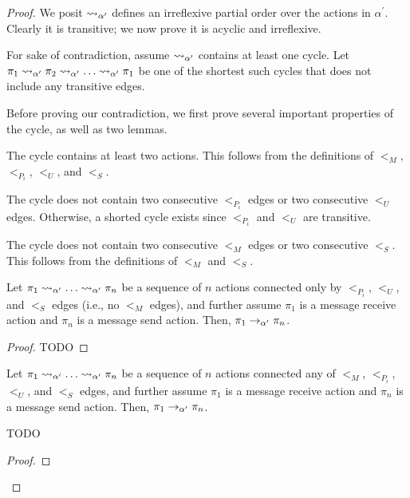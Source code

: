 \begin{proof}
  We posit $\rightsquigarrow_{\alpha^\prime}$ defines an irreflexive partial order over the actions
  in $\alpha^\prime$. Clearly it is transitive; we now prove it is acyclic and irreflexive.

  For sake of contradiction, assume $\rightsquigarrow_{\alpha^\prime}$ contains at least one cycle. Let
  $\pi_1 \rightsquigarrow_{\alpha^\prime} \pi_2 \rightsquigarrow_{\alpha^\prime} \ldots \rightsquigarrow_{\alpha^\prime} \pi_1$
  be one of the shortest such cycles that does not include any transitive edges.

  Before proving our contradiction, we first prove several important properties of the cycle,
  as well as two lemmas.

   The cycle contains at least two actions.
  This follows from the definitions of $<_M$, $<_{P_i}$, $<_U$, and $<_S$.

   The cycle does not contain two consecutive
  $<_{P_i}$ edges or two consecutive $<_U$ edges. Otherwise, a shorted cycle
  exists since $<_{P_i}$ and $<_U$ are transitive.

   The cycle does not contain two consecutive
  $<_M$ edges or two consecutive $<_S$. This follows from the definitions of
  $<_M$ and $<_S$.

  \begin{sublemma}
    Let $\pi_1 \rightsquigarrow_{\alpha^\prime} \ldots \rightsquigarrow_{\alpha^\prime} \pi_n$
    be a sequence of $n$ actions connected only by
    $<_{P_i}$, $<_U$, and $<_S$ edges (i.e., no $<_M$ edges), and further
    assume $\pi_1$ is a message receive action and $\pi_n$ is a message
    send action. Then, $\pi_1 \rightarrow_{\alpha^\prime} \pi_n$.
    \label{lemma:helper1}
  \end{sublemma}

  \begin{proof}
    TODO
  \end{proof}

  \begin{lemma}
    Let $\pi_1 \rightsquigarrow_{\alpha^\prime} \ldots \rightsquigarrow_{\alpha^\prime} \pi_n$
    be a sequence of $n$ actions connected any of $<_M$, $<_{P_i}$, $<_U$,
    and $<_S$ edges, and further assume $\pi_1$ is a message receive action
    and $\pi_n$ is a message send action. Then, $\pi_1 \rightarrow_{\alpha^\prime} \pi_n$.
    \label{lemma:helper2}
  \end{lemma}
    TODO
  \begin{proof}
    
  \end{proof}


\end{proof}
